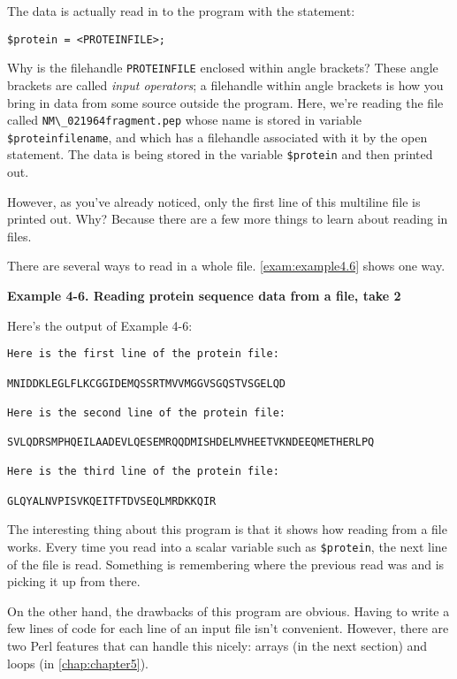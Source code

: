 The data is actually read in to the program with the statement:

\begin{lstlisting}
$protein = <PROTEINFILE>;
\end{lstlisting}

Why is the filehandle \verb|PROTEINFILE| enclosed within angle brackets? These angle brackets are called \textit{input operators}; a filehandle within angle brackets is how you bring in data from some source outside the program.  Here, we're reading the file called \verb|NM\_021964fragment.pep| whose name is stored in variable \verb|$proteinfilename|, and which has a filehandle associated with it by the open statement. The data is being stored in the variable \verb|$protein| and then printed out.

However, as you've already noticed, only the first line of this multiline file is printed out. Why? Because there are a few more things to learn about reading in files.

There are several ways to read in a whole file. \autoref{exam:example4.6} shows one way.

\textbf{Example 4-6. Reading protein sequence data from a file, take 2}



Here's the output of Example 4-6:

\begin{lstlisting}
Here is the first line of the protein file:

MNIDDKLEGLFLKCGGIDEMQSSRTMVVMGGVSGQSTVSGELQD

Here is the second line of the protein file:

SVLQDRSMPHQEILAADEVLQESEMRQQDMISHDELMVHEETVKNDEEQMETHERLPQ

Here is the third line of the protein file:

GLQYALNVPISVKQEITFTDVSEQLMRDKKQIR
\end{lstlisting}

The interesting thing about this program is that it shows how reading from a file works. Every time you read into a scalar variable such as \verb|$protein|, the next line of the file is read. Something is remembering where the previous read was and is picking it up from there.

On the other hand, the drawbacks of this program are obvious. Having to write a few lines of code for each line of an input file isn't convenient. However, there are two Perl features that can handle this nicely: arrays (in the next section) and loops (in \autoref{chap:chapter5}). 

